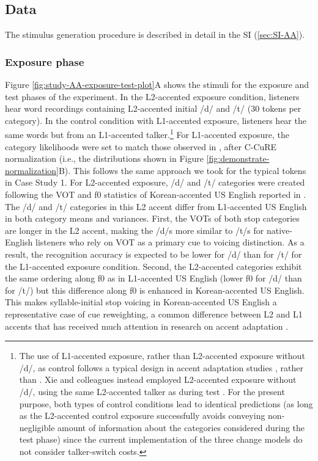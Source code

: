 \documentclass[
  11pt,
  man,floatsintext]{apa6}
\begin{document}
\hypertarget{data-1}{%
\subsection{Data}\label{data-1}}

The stimulus generation procedure is described in detail in the SI (\ref{sec:SI-AA}).

\hypertarget{exposure-phase-1}{%
\subsubsection{Exposure phase}\label{exposure-phase-1}}

Figure \ref{fig:study-AA-exposure-test-plot}A shows the stimuli for the exposure and test phases of the experiment. In the L2-accented exposure condition, listeners hear word recordings containing L2-accented initial /d/ and /t/ (30 tokens per category). In the control condition with L1-accented exposure, listeners hear the same words but from an L1-accented talker.\footnote{The use of L1-accented exposure, rather than L2-accented exposure without /d/, as control follows a typical design in accent adaptation studies \autocite[e.g.,][]{bradlow-bent2008}, rather than \textcite{xie2016jep}. Xie and colleagues instead employed L2-accented exposure without /d/, using the same L2-accented talker as during test \autocite[see also][]{eisner2013}. For the present purpose, both types of control conditions lead to identical predictions (as long as the L2-accented control exposure successfully avoids conveying non-negligible amount of information about the categories considered during the test phase) since the current implementation of the three change models do not consider talker-switch costs.} For L1-accented exposure, the category likelihoods were set to match those observed in \textcite{chodroff-wilson2018}, after C-CuRE normalization (i.e., the distributions shown in Figure \ref{fig:demonstrate-normalization}B). This follows the same approach we took for the typical tokens in Case Study 1. For L2-accented exposure, /d/ and /t/ categories were created following the VOT and f0 statistics of Korean-accented US English reported in \textcite{schertz2015}. The /d/ and /t/ categories in this L2 accent differ from L1-accented US English in both category means and variances. First, the VOTs of both stop categories are longer in the L2 accent, making the /d/s more similar to /t/s for native-English listeners who rely on VOT as a primary cue to voicing distinction. As a result, the recognition accuracy is expected to be lower for /d/ than for /t/ for the L1-accented exposure condition. Second, the L2-accented categories exhibit the same ordering along f0 as in L1-accented US English (lower f0 for /d/ than for /t/) but this difference along f0 is enhanced in Korean-accented US English. This makes syllable-initial stop voicing in Korean-accented US English a representative case of cue reweighting, a common difference between L2 and L1 accents that has received much attention in research on accent adaptation \autocites[e.g.,][]{escudero2009,kim2020,schertz2016}[see also][]{idemaru-holt2011,idemaru-holt2020,harmon2019}.
\end{document}
